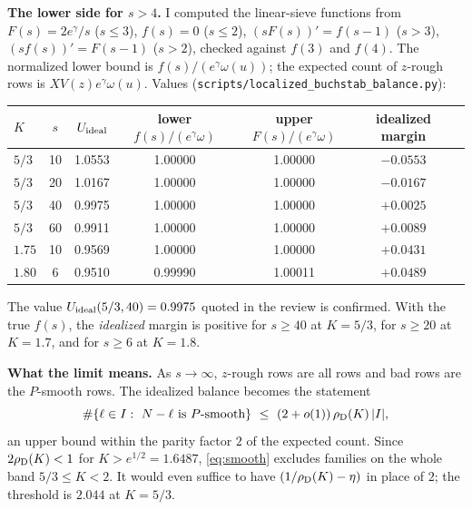 \documentclass[11pt,a4paper]{article}
\theoremstyle{remark}
\begin{document}
\noindent\textbf{The lower side for $s>4$.} I computed the linear-sieve functions from
$F(s)=2e^\gamma/s$ ($s\le3$), $f(s)=0$ ($s\le2$), $(sF(s))'=f(s-1)$ ($s>3$), $(sf(s))'=F(s-1)$ ($s>2$),
checked against $f(3)$ and $f(4)$. The normalized lower bound is $f(s)/(e^\gamma\omega(u))$; the expected
count of $z$-rough rows is $XV(z)e^\gamma\omega(u)$. Values
(\texttt{scripts/localized\_buchstab\_balance.py}):
\begin{center}
\begin{tabular}{@{}lcccccc@{}}
\toprule
$K$ & $s$ & $U_{\rm ideal}$ & lower $f(s)/(e^\gamma\omega)$ & upper $F(s)/(e^\gamma\omega)$ & idealized margin\\
\midrule
$5/3$ & 10 & 1.0553 & 1.00000 & 1.00000 & $-0.0553$\\
$5/3$ & 20 & 1.0167 & 1.00000 & 1.00000 & $-0.0167$\\
$5/3$ & 40 & 0.9975 & 1.00000 & 1.00000 & $+0.0025$\\
$5/3$ & 60 & 0.9911 & 1.00000 & 1.00000 & $+0.0089$\\
$1.75$ & 10 & 0.9569 & 1.00000 & 1.00000 & $+0.0431$\\
$1.80$ & 6 & 0.9510 & 0.99990 & 1.00011 & $+0.0489$\\
\bottomrule
\end{tabular}
\end{center}
The value $U_{\rm ideal}(5/3,40)=0.9975$ quoted in the review is confirmed. With the true $f(s)$, the
\emph{idealized} margin is positive for $s\ge40$ at $K=5/3$, for $s\ge20$ at $K=1.7$, and for $s\ge6$ at
$K=1.8$.

\noindent\textbf{What the limit means.} As $s\to\infty$, $z$-rough rows are all rows and bad rows are the
$P$-smooth rows. The idealized balance becomes the statement
\begin{equation}\label{eq:smooth}
\#\{\ell\in I:\ N-\ell\ \text{is $P$-smooth}\}\ \le\ (2+o(1))\,\rho_{\rm D}(K)\,|I|,
\end{equation}
an upper bound within the parity factor $2$ of the expected count. Since $2\rho_{\rm D}(K)<1$ for
$K>e^{1/2}=1.6487$, \eqref{eq:smooth} excludes families on the whole band $5/3\le K<2$. It would even
suffice to have $(1/\rho_{\rm D}(K)-\eta)$ in place of $2$; the threshold is $2.044$ at $K=5/3$.
\end{document}
